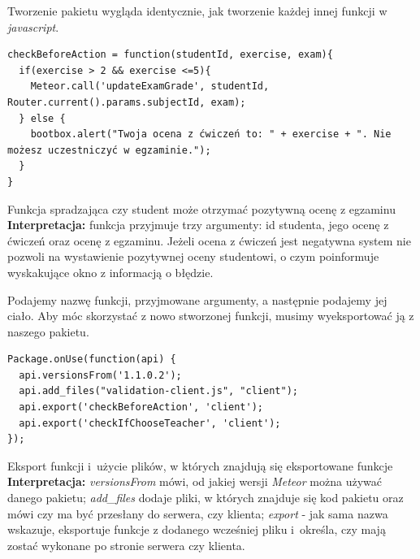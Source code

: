 \documentclass[openright]{xmgr}
\begin{document}
\indent Tworzenie pakietu wygląda identycznie, jak tworzenie każdej innej funkcji w \textit{javascript}.
\begin{listing}[H]
\begin{verbatim}
checkBeforeAction = function(studentId, exercise, exam){
  if(exercise > 2 && exercise <=5){
    Meteor.call('updateExamGrade', studentId, Router.current().params.subjectId, exam);
  } else {
    bootbox.alert("Twoja ocena z ćwiczeń to: " + exercise + ". Nie możesz uczestniczyć w egzaminie.");
  }
}
\end{verbatim}
\caption{Funkcja spradzająca czy student może otrzymać pozytywną ocenę z egzaminu \newline \newline \hspace{\linewidth} \textbf{Interpretacja:} funkcja przyjmuje trzy argumenty: id studenta, jego ocenę z ćwiczeń oraz ocenę z egzaminu. Jeżeli ocena z ćwiczeń jest negatywna system nie pozwoli na wystawienie pozytywnej oceny studentowi, o czym poinformuje wyskakujące okno z informacją o błędzie. \newline}
\end{listing}

Podajemy nazwę funkcji, przyjmowane argumenty, a następnie podajemy jej ciało. Aby móc skorzystać z nowo stworzonej funkcji, musimy wyeksportować ją z naszego pakietu.

\begin{listing}[H]
\begin{verbatim}
Package.onUse(function(api) {
  api.versionsFrom('1.1.0.2');
  api.add_files("validation-client.js", "client");
  api.export('checkBeforeAction', 'client');
  api.export('checkIfChooseTeacher', 'client');
});
\end{verbatim}
\caption{Eksport funkcji i~użycie plików, w których znajdują się eksportowane funkcje \newline \newline \hspace{\linewidth} \textbf{Interpretacja:} \textit{versionsFrom} mówi, od jakiej wersji \textit{Meteor} można używać danego pakietu; \textit{add\_files} dodaje pliki, w których znajduje się kod pakietu oraz mówi czy ma być przesłany do serwera, czy klienta; \textit{export} - jak sama nazwa wskazuje, eksportuje funkcje z dodanego wcześniej pliku i~określa, czy mają zostać wykonane po stronie serwera czy klienta.  \newline}
\end{listing}
\end{document}

